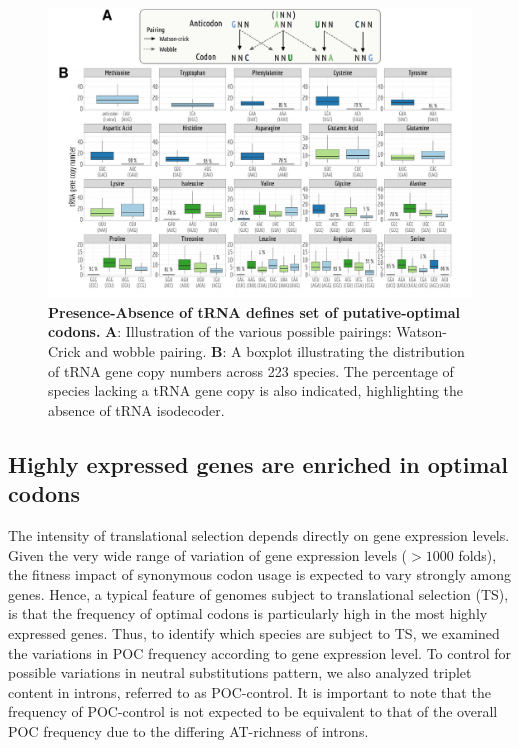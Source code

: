 \begin{figure}[t]   
    \begin{center}
        \includegraphics[width=\textwidth]{Figure3.pdf}
    \end{center}                                                                       
    \caption[Presence-Absence of tRNA defines set of putative-optimal codons]{\textbf{Presence-Absence of tRNA defines set of putative-optimal codons.} \textbf{A}: Illustration of the various possible pairings: Watson-Crick and wobble pairing. \textbf{B}: A boxplot illustrating the distribution of tRNA gene copy numbers across 223 species. The percentage of species lacking a tRNA gene copy is also indicated, highlighting the absence of tRNA isodecoder.}
    \label{fig:CU3}
\end{figure}


\subsection{Highly expressed genes are enriched in optimal codons}

The intensity of translational selection depends directly on gene expression levels. Given the very wide range of variation of gene expression levels ($> 1000$ folds), the fitness impact of synonymous codon usage is expected to vary strongly among genes. Hence, a typical feature of genomes subject to translational selection (TS), is that the frequency of optimal codons is particularly high in the most highly expressed genes. Thus, to identify which species are subject to TS, we examined the variations in POC frequency according to gene expression level. To control for possible variations in neutral substitutions pattern, we also analyzed triplet content in introns, referred to as POC-control. It is important to note that the frequency of POC-control is not expected to be equivalent to that of the overall POC frequency due to the differing AT-richness of introns.

